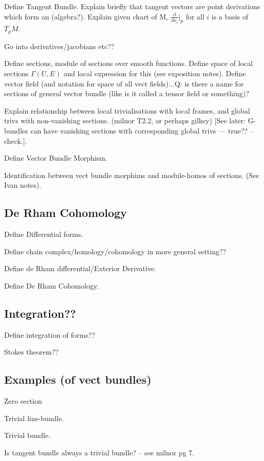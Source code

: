\documentclass[a4paper]{article}
\theoremstyle{definition} \newtheorem*{definition}{Definition}
\theoremstyle{definition} \newtheorem*{definitions}{Definitions}
\theoremstyle{plain} \newtheorem{theorem}{Theorem}[section]
\theoremstyle{plain} \newtheorem{proposition}[theorem]{Proposition}
\theoremstyle{plain} \newtheorem{corollary}[theorem]{Corollary}
\theoremstyle{plain} \newtheorem{lemma}[theorem]{Lemma}
\theoremstyle{plain} \newtheorem{example}[theorem]{Example}
\begin{document}
Define Tangent Bundle. 
Explain briefly that tangent vectors are point derivations which form an (algebra?).
Explain given chart of M, $\frac{\partial}{\partial{x_i}} |_p$ for all $i$ is a basis of $T_p M$.

Go into derivatives/jacobians etc??

Define sections, module of sections over smooth functions. Define space of local sections $\Gamma (U, E)$ and local expression for this (see exposition notes).
Define vector field (and notation for space of all vect fields)...Q: is there a name for sections of general vector bundle (like is it called a tensor field or something)?

Explain relationship between local trivialisations with local frames, and global trivs with non-vanishing sections. (milnor T2.2, or perhaps gilkey)
[See later: G-bundles can have vanishing sections with corresponding global trivs --- true?? --check.]. 

Define Vector Bundle Morphism.

Identification between vect bundle morphims and module-homos of sections. (See Ivan notes).

\subsection{De Rham Cohomology}

Define Differential forms.

Define chain complex/homology/cohomology in more general setting??

Define de Rham differential/Exterior Derivative.

Define De Rham Cohomology.

\subsection{Integration??}

Define integration of forms??

Stokes theorem??

\subsection{Examples (of vect bundles)}

Zero section

Trivial line-bundle.

Trivial bundle.

Is tangent bundle always a trivial bundle? -- see milnor pg 7.
\end{document}
